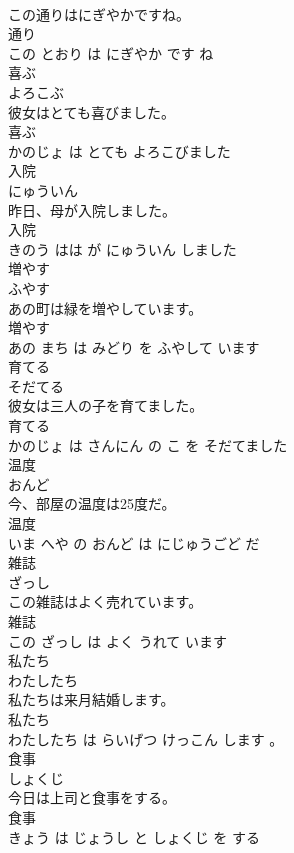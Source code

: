 \documentclass[8pt]{extreport}
\begin{document}
\begin{CJK}{UTF8}{min}
\\	この通りはにぎやかですね。	
\\	通り 
\\	この とおり は にぎやか です ね			
\\	喜ぶ	
\\	よろこぶ			
\\	彼女はとても喜びました。	
\\	喜ぶ 
\\	かのじょ は とても よろこびました			
\\	入院	
\\	にゅういん			
\\	昨日、母が入院しました。	
\\	入院 
\\	きのう はは が にゅういん しました			
\\	増やす	
\\	ふやす			
\\	あの町は緑を増やしています。	
\\	増やす 
\\	あの まち は みどり を ふやして います			
\\	育てる	
\\	そだてる			
\\	彼女は三人の子を育てました。	
\\	育てる 
\\	かのじょ は さんにん の こ を そだてました			
\\	温度	
\\	おんど			
\\	今、部屋の温度は25度だ。	
\\	温度 
\\	いま へや の おんど は にじゅうごど だ			
\\	雑誌	
\\	ざっし			
\\	この雑誌はよく売れています。	
\\	雑誌 
\\	この ざっし は よく うれて います			
\\	私たち	
\\	わたしたち			
\\	私たちは来月結婚します。	
\\	私たち 
\\	わたしたち は らいげつ けっこん します 。			
\\	食事	
\\	しょくじ			
\\	今日は上司と食事をする。	
\\	食事 
\\	きょう は じょうし と しょくじ を する			

\end{CJK}
\end{document}
